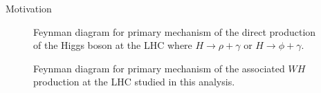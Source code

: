 \begin{section}{Motivation}
\begin{figure}[htb]
\begin{center}

\end{center}
\caption{Feynman diagram\cite{cite-tikz-feynman} for primary mechanism of the direct production of the Higgs boson at the LHC where $H \rightarrow \rho+\gamma$ or $H \rightarrow \phi+\gamma$.}
\label{fig:direct-prod}
\end{figure}

\begin{figure}[htb]
\begin{center}

\end{center}
\caption{Feynman diagram\cite{cite-tikz-feynman} for primary mechanism of the associated $WH$ production at the LHC studied in this analysis.}
\label{fig:whiggs-prod}
\end{figure}
\end{section}

